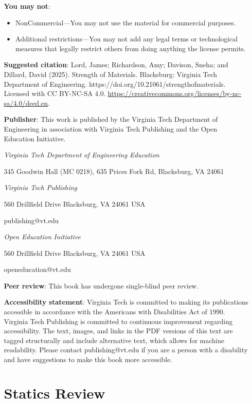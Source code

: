 \documentclass[
  letterpaper,
  DIV=11,
  numbers=noendperiod]{scrreprt}
\theoremstyle{definition}
\theoremstyle{remark}
\begin{document}
\textbf{You may not}:

\begin{itemize}
\item
  NonCommercial---You may not use the material for commercial purposes.
\item
  Additional restrictions---You may not add any legal terms or
  technological measures that legally restrict others from doing
  anything the license permits.
\end{itemize}

\textbf{Suggested citation}: Lord, James; Richardson, Amy; Davison,
Sneha; and Dillard, David (2025). Strength of Materials. Blacksburg:
Virginia Tech Department of Engineering.
https://doi.org/10.21061/strengthofmaterials. Licensed with CC BY-NC-SA
4.0. \url{https://creativecommons.org/licenses/by-nc-sa/4.0/deed.en}.

\textbf{Publisher}: This work is published by the Virginia Tech
Department of Engineering in association with Virginia Tech Publishing
and the Open Education Initiative.

\emph{Virginia Tech Department of Engineering Education}

345 Goodwin Hall (MC 0218), 635 Prices Fork Rd, Blacksburg, VA 24061

\emph{Virginia Tech Publishing}

560 Drillfield Drive Blacksburg, VA 24061 USA

publishing@vt.edu

\emph{Open Education Initiative}

560 Drillfield Drive Blacksburg, VA 24061 USA

openeducation@vt.edu

\textbf{Peer review}: This book has undergone single-blind peer review.

\textbf{Accessibility statement}: Virginia Tech is committed to making
its publications accessible in accordance with the Americans with
Disabilities Act of 1990. Virginia Tech Publishing is committed to
continuous improvement regarding accessibility. The text, images, and
links in the PDF versions of this text are tagged structurally and
include alternative text, which allows for machine readability. Please
contact publishing@vt.edu if you are a person with a disability and have
suggestions to make this book more accessible.


\chapter{Statics Review}\label{sec-statics}
\end{document}
